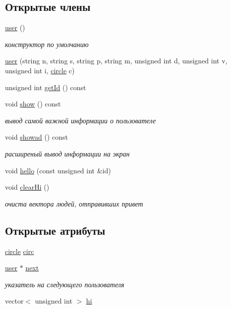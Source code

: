 \subsection*{Открытые члены}
\begin{DoxyCompactItemize}
\item 
\hyperlink{classuser_a86f00bd9662cde8219dfd4601097fa3c}{user} ()
\begin{DoxyCompactList}\small\item\em конструктор по умолчанию \end{DoxyCompactList}\item 
\hyperlink{classuser_ae45f1bafa984f122d9d5eb6740f2d545}{user} (string n, string s, string p, string m, unsigned int d, unsigned int v, unsigned int i, \hyperlink{classcircle}{circle} c)
\item 
unsigned int \hyperlink{classuser_ac5da3a95d4b0afc2b4a3f007138665ba}{get\-Id} () const 
\item 
void \hyperlink{classuser_a94f7a39e4562af925d339fb62dcf6b51}{show} () const 
\begin{DoxyCompactList}\small\item\em вывод самой важной информации о пользователе \end{DoxyCompactList}\item 
void \hyperlink{classuser_ae52afec3c032697288e12b4c898f8f58}{showad} () const 
\begin{DoxyCompactList}\small\item\em расширеный вывод информации на экран \end{DoxyCompactList}\item 
void \hyperlink{classuser_a6cf4003d298be5ecb383242f4639bdb9}{hello} (const unsigned int \&id)
\item 
void \hyperlink{classuser_aedb931481b8ea24e8170923823251790}{clear\-Hi} ()
\begin{DoxyCompactList}\small\item\em очиста вектора людей, отправивших привет \end{DoxyCompactList}\end{DoxyCompactItemize}
\subsection*{Открытые атрибуты}
\begin{DoxyCompactItemize}
\item 
\hyperlink{classcircle}{circle} \hyperlink{classuser_aa3c75aaac5c22cc183ddf6da3c1a0a5e}{circ}
\item 
\hyperlink{classuser}{user} $\ast$ \hyperlink{classuser_aea47cda4229402a71223b4c5619fae97}{next}
\begin{DoxyCompactList}\small\item\em указатель на следующего пользователя \end{DoxyCompactList}\item 
vector$<$ unsigned int $>$ \hyperlink{classuser_a3818c768915004dd7263312cd5253bbd}{hi}
\end{DoxyCompactItemize}

